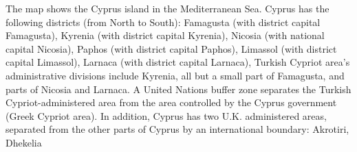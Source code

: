 \documentclass{article}
\begin{document}
\begin{enumerate}[label=(\alph*)]
\begin{itemize}
{			The map shows the Cyprus island in the Mediterranean Sea.  Cyprus has the following districts (from North to South): Famagusta (with district capital Famagusta), Kyrenia (with district capital Kyrenia), Nicosia  (with national capital Nicosia), Paphos (with district capital Paphos), Limassol (with district capital Limassol), Larnaca (with district capital Larnaca), Turkish Cypriot area's administrative divisions include Kyrenia, all but a small part of Famagusta, and parts of Nicosia and Larnaca.  A United Nations buffer zone separates the Turkish Cypriot-administered area from the area controlled by the Cyprus government (Greek Cypriot area). In addition, Cyprus has two U.K. administered areas, separated from the other parts of Cyprus by an international boundary: Akrotiri, Dhekelia}
		\end{itemize}
	\end{enumerate}
\end{document}
